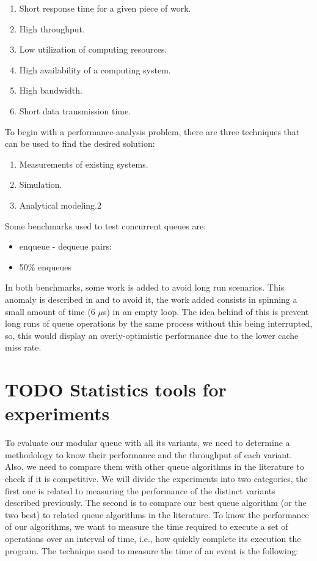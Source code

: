 \documentclass{latex/classes/thesis}
\begin{document}
\begin{enumerate}
\item Short response time for a given piece of work.
\item High throughput.
\item Low utilization of computing resources.
\item High availability of a computing system.
\item High bandwidth.
\item Short data transmission time.
\end{enumerate}

To begin with a performance-analysis problem, there are three techniques
that can be used to find the desired solution:

\begin{enumerate}
\item Measurements of existing systems.
\item Simulation.
\item Analytical modeling.2
\end{enumerate}

Some benchmarks used to test concurrent queues are:

\begin{itemize}
\item enqueue - dequeue pairs:
\item 50\% enqueues
\end{itemize}

In both benchmarks, some work is added to avoid long run scenarios. This
anomaly is described in \cite{DBLP_conf_podc_MichaelS96} and to avoid it, the
work added consists in spinning a small amount of time (6 \(\mu\)s) in an
empty loop. The idea behind of this is prevent long runs of queue operations
by the same process without this being interrupted, so, this would display
an overly-optimistic performance due to the lower cache miss rate.

\section{{\bfseries\sffamily TODO} Statistics tools for experiments}
\label{sec:orge5f002e}

To evaluate our modular queue with all its variants, we need to determine a
methodology to know their performance and the throughput of each
variant. Also, we need to compare them with other queue algorithms in the
literature to check if it is competitive. We will divide the experiments into
two categories, the first one is related to measuring the performance of the
distinct variants described previously. The second is to compare our best
queue algorithm (or the two best) to related queue algorithms in the
literature. To know the performance of our algorithms, we want to measure the
time required to execute a set of operations over an interval of time, i.e.,
how quickly complete its execution the program. The technique used to measure
the time of an event is the following:
\end{document}

